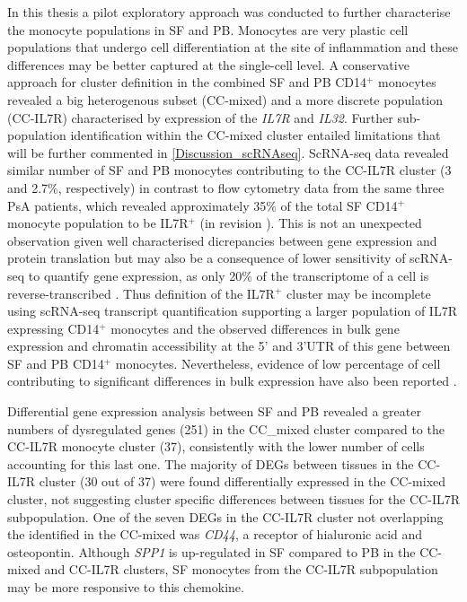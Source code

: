 In this thesis a pilot exploratory approach was conducted to further characterise the monocyte populations in SF and PB. Monocytes are very plastic cell populations that undergo cell differentiation at the site of inflammation and these differences may be better captured at the single-cell level. A conservative approach for cluster definition in the combined SF and PB CD14$^+$ monocytes revealed a big heterogenous subset (CC-mixed) and a more discrete population (CC-IL7R) characterised by expression of the \textit{IL7R} and \textit{IL32}. Further sub-population identification within the CC-mixed cluster entailed limitations that will be further commented in \ref{Discussion_scRNAseq}. ScRNA-seq data revealed similar number of SF and PB monocytes contributing to the CC-IL7R cluster (3 and 2.7\%, respectively) in contrast to flow cytometry data from the same three PsA patients, which revealed approximately 35\% of the total SF CD14$^+$ monocyte population to be IL7R$^+$ (in revision \parencite{Al-Mossawi2018}). This is not an unexpected observation given well characterised dicrepancies between gene expression and protein translation but may also be a consequence of lower sensitivity of scRNA-seq to quantify gene expression, as only 20\% of the transcriptome of a cell is reverse-transcribed \parencite{Liu2016,Islam2014}. Thus definition of the IL7R$^+$ cluster may be incomplete using scRNA-seq transcript quantification supporting a larger population of IL7R expressing CD14$^+$ monocytes and the observed differences in bulk gene expression and chromatin accessibility at the 5' and 3'UTR of this gene between SF and PB CD14$^+$ monocytes. Nevertheless, evidence of low percentage of cell contributing to significant differences in bulk expression have also been reported \parencite{}.

Differential gene expression analysis between SF and PB revealed a greater numbers of dysregulated genes (251) in the CC_mixed cluster compared to the CC-IL7R monocyte cluster (37), consistently with the lower number of cells accounting for this last one. The majority of DEGs between tissues in the CC-IL7R cluster (30 out of 37) were found differentially expressed in the CC-mixed cluster, not suggesting cluster specific differences between tissues for the CC-IL7R subpopulation. One of the seven DEGs in the CC-IL7R cluster not overlapping the identified in the CC-mixed was \textit{CD44}, a receptor of hialuronic acid and osteopontin. Although \textit{SPP1} is up-regulated in SF compared to PB  in the CC-mixed and CC-IL7R clusters, SF monocytes from the CC-IL7R subpopulation may be more responsive to this chemokine.


